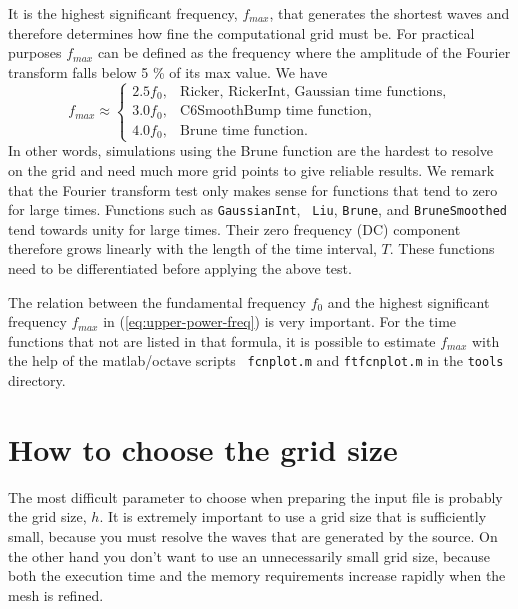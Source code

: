 \documentclass[11pt]{report}
\begin{document}
It is the highest significant frequency, $f_{max}$, that generates the shortest waves
and therefore determines how fine the computational grid must be. For practical purposes $f_{max}$
can be defined as the frequency where the amplitude of the Fourier transform falls below 5 \% of its
max value. We have
\begin{equation}\label{eq:upper-power-freq}
f_{max} \approx \begin{cases}
2.5 f_0,&\mbox{Ricker, RickerInt, Gaussian time functions},\\
3.0 f_0,&\mbox{C6SmoothBump time function},\\
4.0 f_0,&\mbox{Brune time function}.
\end{cases}
\end{equation}
In other words, simulations using the Brune function are the hardest to resolve on the grid and need much
more grid points to give reliable results. We remark that the Fourier transform test only makes
sense for functions that tend to zero for large times. Functions such as {\tt GaussianInt}, {\tt
  Liu}, {\tt Brune}, and {\tt BruneSmoothed} tend towards unity for large times. Their zero
frequency (DC) component therefore grows linearly with the length of the time interval, $T$. These
functions need to be differentiated before applying the above test.

The relation between the fundamental frequency $f_0$ and the highest significant frequency $f_{max}$
in (\ref{eq:upper-power-freq}) is very important. For the time functions that not are listed in that
formula, it is possible to estimate $f_{max}$ with the help of the matlab/octave scripts {\tt
  fcnplot.m} and {\tt ftfcnplot.m} in the {\tt tools} directory.

\section{How to choose the grid size} \label{sec:grid-size}

The most difficult parameter to choose when preparing the input file is probably the grid size,
$h$. It is extremely important to use a grid size that is sufficiently small, because you must resolve
the waves that are generated by the source. On the other hand you don't want to use an
unnecessarily small grid size, because both the execution time and the memory requirements
increase rapidly when the mesh is refined.
\end{document}
